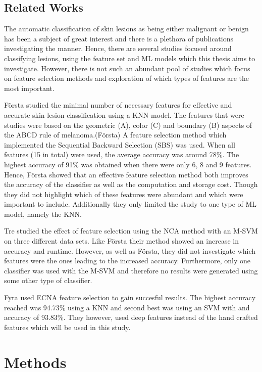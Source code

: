 \documentclass{kththesis}
\begin{document}
\section{Related Works}


The automatic classification of skin lesions as being either malignant or benign has been a subject of great interest and there is a plethora of publications investigating the manner. Hence, there are several studies focused around classifying lesions, using the feature set and ML models which this thesis aims to investigate. However, there is not such an abundant pool of studies which focus on feature selection methods and exploration of which types of features are the most important. 

Första studied the minimal number of necessary features for effective and accurate skin lesion classification using a KNN-model.  The features that were studies were based on the geometric (A), color (C)  and boundary (B) aspects of the ABCD rule of melanoma.(Första) A feature selection method which implemented the Sequential Backward Selection (SBS) was used. When all features (15 in total) were used, the average accuracy was around 78\%. The highest accuracy of 91\% was obtained when there were only 6, 8 and 9 features. Hence, Första showed that an effective feature selection method both improves the accuracy of the classifier as well as the computation and storage cost. Though they did not highlight which of these features were abundant and which were important to include. Additionally they only limited the study to one type of ML model, namely the KNN. 

Tre studied the effect of feature selection using the NCA method with an M-SVM on three different data sets. Like Första their method showed an increase in accuracy and runtime. However, as well as Första, they did not investigate which features were the ones leading to the increased accuracy. Furthermore, only one classifier was used with the M-SVM and therefore no results were generated using some other type of classifier. 

Fyra used ECNA feature selection to gain succesful results. The highest accuracy reached was 94.73\% using a KNN and second best was using an SVM with and accuracy of 93.83\%. They however, used deep features instead of the hand crafted features which will be used in this study.


\chapter{Methods}
\end{document}
